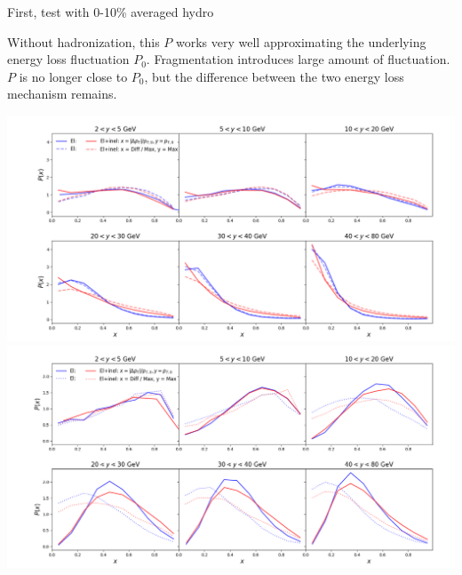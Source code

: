 \documentclass[11pt]{beamer}
\begin{document}
\begin{frame}{First, test with 0-10\% averaged hydro}
\begin{overprint}
Without hadronization, this $P$ works very well approximating the underlying energy loss fluctuation $P_0$.
Fragmentation introduces large amount of fluctuation. $P$ is no longer close to $P_0$, but the difference between the two energy loss mechanism remains.
\end{overprint}

\begin{overprint}
\includegraphics[width=\textwidth]{fig/Event-avg-quark-fluct.png}
\includegraphics[width=\textwidth]{fig/Event-avg-meson-fluct.png}
\end{overprint}

\end{frame}
\end{document}
